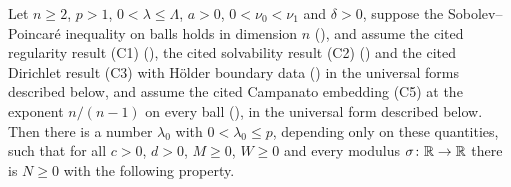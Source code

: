 \begin{theorem}[Theorem 4]
Let $n\ge2$, $p>1$, $0<\lambda\le\Lambda$, $a>0$, $0<\nu_0<\nu_1$ and
$\delta>0$, suppose the Sobolev--Poincar\'e inequality on balls holds in dimension $n$
(), and assume the cited regularity result
(C1) (), the cited solvability result (C2)
() and the cited Dirichlet result (C3) with
H\"older boundary data () in the universal forms
described below, and assume the cited Campanato embedding (C5) at the exponent
$n/(n-1)$ on every ball (), in the universal
form described below.  Then there is a number $\lambda_0$ with
$0<\lambda_0\le p$, depending only on these quantities, such that for all
$c>0$, $d>0$, $M\ge0$, $W\ge0$ and every modulus $\sigma\colon\mathbb{R}\to\mathbb{R}$ there is
$N\ge0$ with the following property.


\end{theorem}

